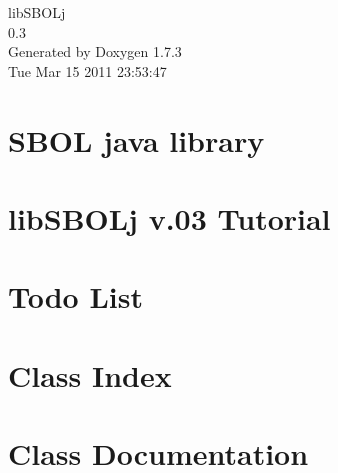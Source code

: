 \documentclass[a4paper]{book}
\begin{document}
\hypersetup{pageanchor=false}
\begin{titlepage}
\vspace*{7cm}
\begin{center}
{\Large libSBOLj \\[1ex]\large 0.3 }\\
\vspace*{1cm}
{\large Generated by Doxygen 1.7.3}\\
\vspace*{0.5cm}
{\small Tue Mar 15 2011 23:53:47}\\
\end{center}
\end{titlepage}
\clearemptydoublepage
{}
\tableofcontents
\clearemptydoublepage
{}
\hypersetup{pageanchor=true}
\chapter{SBOL java library}
\label{index}\hypertarget{index}{}
\chapter{libSBOLj v.03 Tutorial}
\label{tutorial}
\hypertarget{tutorial}{}

\chapter{Todo List}
\label{todo}
\hypertarget{todo}{}

\chapter{Class Index}

\chapter{Class Documentation}














\printindex
\end{document}
